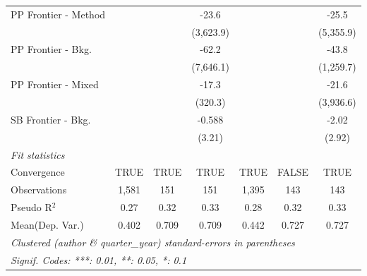 \begin{tabular}{lcccccc}
   PP Frontier - Method &         &         & -23.6     &              &           & -25.5\\   
                        &         &         & (3,623.9) &              &           & (5,355.9)\\   
   PP Frontier - Bkg.   &         &         & -62.2     &              &           & -43.8\\   
                        &         &         & (7,646.1) &              &           & (1,259.7)\\   
   PP Frontier - Mixed  &         &         & -17.3     &              &           & -21.6\\   
                        &         &         & (320.3)   &              &           & (3,936.6)\\   
   SB Frontier - Bkg.   &         &         & -0.588    &              &           & -2.02\\   
                        &         &         & (3.21)    &              &           & (2.92)\\   
   \midrule
   \emph{Fit statistics}\\
   Convergence          &TRUE     & TRUE    & TRUE      & TRUE         & FALSE     & TRUE\\  
   Observations         & 1,581   & 151     & 151       & 1,395        & 143       & 143\\  
   Pseudo R$^2$         & 0.27    & 0.32    & 0.33      & 0.28         & 0.32      & 0.33\\  
Mean(Dep. Var.) & 0.402 & 0.709 & 0.709 & 0.442 & 0.727 & 0.727 \\
   \midrule \midrule
   \multicolumn{7}{l}{\emph{Clustered (author \& quarter\_year) standard-errors in parentheses}}\\
   \multicolumn{7}{l}{\emph{Signif. Codes: ***: 0.01, **: 0.05, *: 0.1}}\\
\end{tabular}
\par\endgroup
